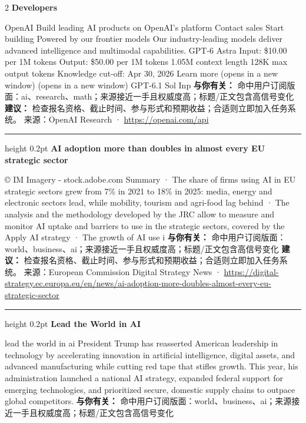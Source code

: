\documentclass[10.5pt]{ctexart}
\begin{document}
\begin{multicols}{2}
{\large\bfseries Developers}\par
OpenAI Build leading AI products on OpenAI’s platform Contact sales Start building Powered by our frontier models Our industry-leading models deliver advanced intelligence and multimodal capabilities. GPT-6 Astra Input: \$10.00 per 1M tokens Output: \$50.00 per 1M tokens 1.05M context length 128K max output tokens Knowledge cut-off: Apr 30, 2026 Learn more (opens in a new window) (opens in a new window) GPT-6.1 Sol Inp
\textbf{与你有关：} 命中用户订阅版面：ai、research、math；来源接近一手且权威度高；标题/正文包含高信号变化
\textbf{建议：} 检查报名资格、截止时间、参与形式和预期收益；合适则立即加入任务系统。
{\footnotesize\color{ormuted} 来源：OpenAI Research · \url{https://openai.com/api}}
\vspace{2mm}
\hrule height 0.2pt
\vspace{2mm}
{\large\bfseries AI adoption more than doubles in almost every EU strategic sector}\par
© IM Imagery - stock.adobe.com Summary · The share of firms using AI in EU strategic sectors grew from 7\% in 2021 to 18\% in 2025: media, energy and electronic sectors lead, while mobility, tourism and agri-food lag behind · The analysis and the methodology developed by the JRC allow to measure and monitor AI uptake and barriers to use in the strategic sectors, covered by the Apply AI strategy · The growth of AI use i
\textbf{与你有关：} 命中用户订阅版面：world、business、ai；来源接近一手且权威度高；标题/正文包含高信号变化
\textbf{建议：} 检查报名资格、截止时间、参与形式和预期收益；合适则立即加入任务系统。
{\footnotesize\color{ormuted} 来源：European Commission Digital Strategy News · \url{https://digital-strategy.ec.europa.eu/en/news/ai-adoption-more-doubles-almost-every-eu-strategic-sector}}
\vspace{2mm}
\hrule height 0.2pt
\vspace{2mm}
{\large\bfseries Lead the World in AI}\par
lead the world in ai President Trump has reasserted American leadership in technology by accelerating innovation in artificial intelligence, digital assets, and advanced manufacturing while cutting red tape that stifles growth. This year, his administration launched a national AI strategy, expanded federal support for emerging technologies, and prioritized secure, domestic supply chains to outpace global competitors.
\textbf{与你有关：} 命中用户订阅版面：world、business、ai；来源接近一手且权威度高；标题/正文包含高信号变化

\end{multicols}
\end{document}
